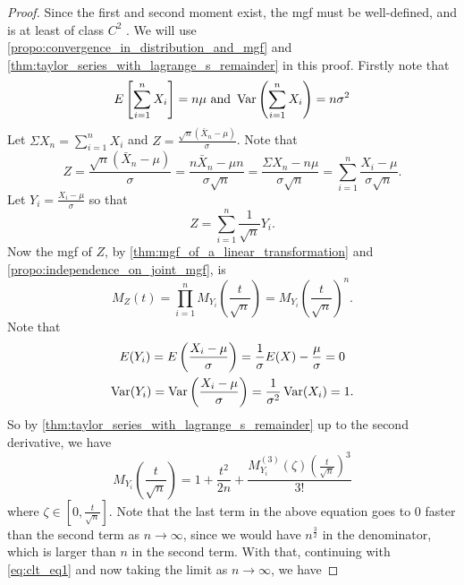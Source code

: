 \documentclass[notoc,notitlepage]{tufte-book}
\begin{document}
\begin{proof}
  Since the first and second moment exist, the mgf must be well-defined, and is at least of class $C^2$ . We will use \cref{propo:convergence_in_distribution_and_mgf} and\\ \noindent \cref{thm:taylor_series_with_lagrange_s_remainder} in this proof. Firstly note that
  \begin{equation*}
    E\left[ \sum_{i=1}^{n} X_i \right] = n \mu \text{ and } \operatorname{Var}\left( \sum_{i=1}^{n} X_i \right) = n \sigma^2
  \end{equation*}
  Let $\Sigma X_n = \sum_{i=1}^{n} X_i$ and $Z = \frac{\sqrt{n} ( \bar{X}_n - \mu )}{\sigma}$. Note that
  \begin{equation*}
    Z = \frac{\sqrt{n} ( \bar{X}_n - \mu )}{\sigma} = \frac{n \bar{X}_n - \mu n}{\sigma \sqrt{n}} = \frac{\Sigma X_n - n \mu}{\sigma \sqrt{n}} = \sum_{i=1}^{n} \frac{X_i - \mu}{\sigma \sqrt{n}}.
  \end{equation*}
  Let $Y_i = \frac{X_i - \mu}{\sigma}$ so that
  \begin{equation*}
    Z = \sum^{n}_{i=1} \frac{1}{\sqrt{n}} Y_i.
  \end{equation*}
  Now the mgf of $Z$, by \cref{thm:mgf_of_a_linear_transformation} and \cref{propo:independence_on_joint_mgf}, is
  \begin{equation}\label{eq:clt_eq1}
    M_Z(t) = \prod_{i=1}^{n} M_{Y_i}\left(\frac{t}{\sqrt{n}}\right) = M_{Y_i}\left(\frac{t}{\sqrt{n}}\right)^n.
  \end{equation}
  Note that
  \begin{gather*}
    E(Y_i) = E\left( \frac{X_i - \mu}{\sigma} \right) = \frac{1}{\sigma} E(X) - \frac{\mu}{\sigma} = 0 \\
    \operatorname{Var}(Y_i) = \operatorname{Var}\left( \frac{X_i - \mu}{\sigma} \right) = \frac{1}{\sigma^2} \operatorname{Var}(X_i) = 1.
  \end{gather*}
  So by \cref{thm:taylor_series_with_lagrange_s_remainder} up to the second derivative, we have
  \begin{equation*}
    M_{Y_i}\left(\frac{t}{\sqrt{n}}\right) = 1 + \frac{t^2}{2n} + \frac{M_{Y_i}^{(3)} ( \zeta ) \left( \frac{t}{\sqrt{n}} \right)^3}{3!}
  \end{equation*}
  where $\zeta \in \left[0, \frac{t}{\sqrt{n}}\right]$. Note that the last term in the above equation goes to $0$ faster than the second term as $n \to \infty$, since we would have $n^{\frac{3}{2}}$ in the denominator, which is larger than $n$ in the second term. With that, continuing with \cref{eq:clt_eq1} and now taking the limit as $n \to \infty$, we have

\end{proof}
\end{document}
